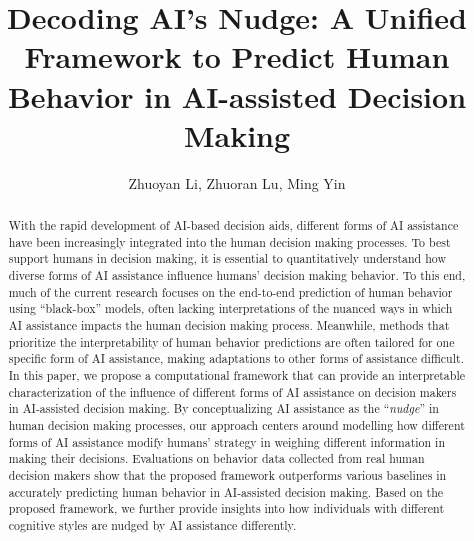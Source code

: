 \documentclass[letterpaper]{article} %
\title{Decoding AI's Nudge:
A Unified Framework to Predict Human Behavior in AI-assisted Decision Making
}
\author {
    Zhuoyan Li,
    Zhuoran Lu,
    Ming Yin
}
\begin{document}
\maketitle

\begin{abstract}

With the rapid development of AI-based decision aids,
different forms of AI assistance have been increasingly integrated into the human decision making processes.
To best support humans in decision making, it is essential to quantitatively understand how diverse forms of AI assistance influence humans' decision making behavior. To this end, much of the current research focuses on the end-to-end prediction of human behavior using ``black-box'' models, often lacking interpretations of the nuanced ways in which AI assistance impacts the human decision making process.
Meanwhile, methods that prioritize the interpretability of human behavior predictions are often tailored for one specific form of AI assistance, making adaptations to other forms of assistance difficult.
In this paper, we propose a computational framework that can provide an interpretable characterization of the influence of different forms of AI assistance on decision makers in AI-assisted decision making.  By conceptualizing  AI assistance as the ``{\em nudge}'' in human decision making processes, our approach centers around modelling how different forms of AI assistance modify humans' strategy in weighing different information in making their decisions. Evaluations on behavior data collected from real human decision makers
show that the proposed framework outperforms various
baselines in accurately predicting human behavior in AI-assisted decision making. Based on the proposed framework, we further provide insights into how individuals with different cognitive styles are nudged by AI assistance differently.
\end{abstract}
\end{document}
